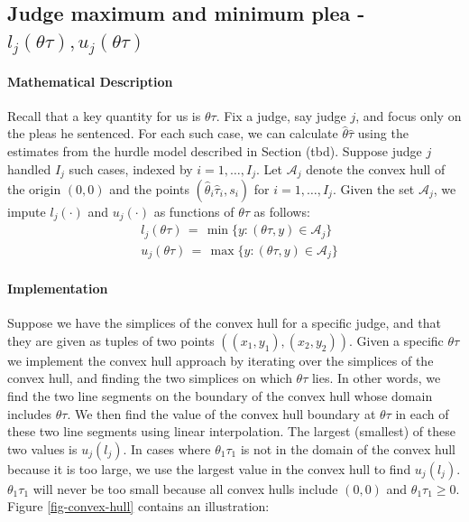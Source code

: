\documentclass[11pt, oneside]{article}   	%
\theoremstyle{ModifiedStyle}
\begin{document}
  \subsection{Judge maximum and minimum plea - $l_j(\theta \tau),u_j(\theta \tau)$}\label{convex_hull-estimation}
    \paragraph{Mathematical Description} Recall that a key quantity for us is $\theta\tau$. Fix a judge, say judge $j$, and focus only on the pleas he sentenced. For each such case, we can calculate $\hat{\theta}\hat{\tau}$ using the estimates from the hurdle model described in Section (tbd). Suppose judge $j$ handled $I_j$ such cases, indexed by $i=1,\ldots,I_j$. Let $\mathcal{A}_j$ denote the convex hull of the origin $(0,0)$ and the points $(\hat{\theta}_i\hat{\tau}_i,s_i)$ for $i=1,\ldots,I_j$. Given the set $\mathcal{A}_j$, we impute $l_j(\cdot)$ and $u_j(\cdot)$ as functions of $\theta\tau$ as follows:
		\begin{align*}
			&l_j(\theta\tau) \,=\, \min\{y:(\theta\tau,y)\in\mathcal{A}_j \} \\
			&u_j(\theta\tau) \,=\, \max\{y:(\theta\tau,y)\in\mathcal{A}_j \}
		\end{align*}

   \paragraph{Implementation}
   Suppose we have the simplices of the convex hull for a specific judge, and that they are given as tuples of two points $((x_1,y_1),(x_2,y_2))$. Given a specific $\theta \tau$ we implement the convex hull approach by iterating over the simplices of the convex hull, and finding the two simplices on which $\theta \tau$ lies. In other words, we find the two line segments on the boundary of the convex hull whose domain includes $\theta \tau$. We then find the value of the convex hull boundary at $\theta \tau$ in each of these two line segments using linear interpolation. The largest (smallest) of these two values is $u_j (l_j)$. In cases where $\theta_1 \tau_1$ is not in the domain of the convex hull because it is too large, we use the largest value in the convex hull to find $u_j (l_j)$. $\theta_1 \tau_1$ will never be too small because all convex hulls include $(0,0)$ and $\theta_1 \tau_1 \geq 0$. Figure \ref{fig-convex-hull} contains an illustration:
\end{document}

